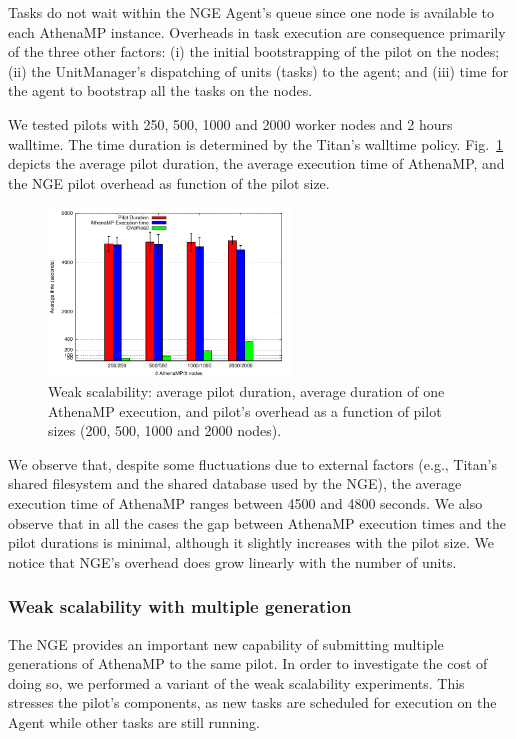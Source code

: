 Tasks do not wait within the NGE Agent's queue since one node is available to
each AthenaMP instance. Overheads in task execution are consequence primarily
of the three other factors: (i) the initial bootstrapping of the pilot on the
nodes; (ii) the UnitManager's dispatching of units (tasks) to the agent; and
(iii) time for the agent to bootstrap all the tasks on the nodes.

We tested pilots with 250, 500, 1000 and 2000 worker nodes and 2 hours
walltime. The time duration is determined by the Titan's walltime policy.
Fig.~\ref{fig:weakScal1a} depicts the average pilot duration, the average
execution time of AthenaMP, and the NGE pilot overhead as function of the
pilot size.

\begin{figure}[!t]
        \includegraphics[height=4.5cm,width=\columnwidth]{./figures/NGE/weak1.pdf}
   	\vspace{-0.3in}
    \caption{Weak scalability: average pilot duration, average duration of one AthenaMP execution, and pilot's overhead as a function of pilot sizes (200, 500, 1000 and 2000 nodes).}
\label{fig:weakScal1a}
\end{figure}

We observe that, despite some fluctuations due to external factors (e.g.,
Titan's shared filesystem and the shared database used by the NGE), the
average execution time of AthenaMP ranges between 4500 and 4800 seconds. We
also observe that in all the cases the gap between AthenaMP execution times
and the pilot durations is minimal, although it slightly increases with the
pilot size. We notice that NGE's overhead does grow linearly with the number
of units.

\subsubsection{Weak scalability with multiple generation }

The NGE provides an important new capability of submitting multiple
generations of AthenaMP to the same pilot. In order to investigate the cost
of doing so, we performed a variant of the weak scalability experiments. This
stresses the pilot's components, as new tasks are scheduled for execution on
the Agent while other tasks are still running.

